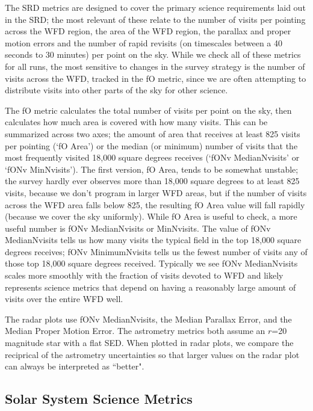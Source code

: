 The SRD metrics are designed to cover the primary science requirements laid out in the SRD; the most relevant of these relate to the number of visits per pointing across the WFD region, the area of the WFD region, the parallax and proper motion errors and the number of rapid revisits (on timescales between a 40 seconds to 30 minutes) per point on the sky. While we check all of these metrics for all runs, the most sensitive to changes in the survey strategy is the number of visits across the WFD, tracked in the fO metric, since we are often attempting to distribute visits into other parts of the sky for other science. 

The fO metric calculates the total number of visits per point on the sky, then calculates how much area is covered with how many visits. This can be summarized across two axes; the amount of area that receives at least 825 visits per pointing (`fO Area') or the median (or minimum) number of visits that the most frequently visited 18,000 square degrees receives (`fONv MedianNvisits' or `fONv MinNvisits'). The first version, fO Area, tends to be somewhat unstable; the survey hardly ever observes more than 18,000 square degrees to at least 825 visits, because we don't program in larger WFD areas, but if the number of visits across the WFD area falls below 825, the resulting fO Area value will fall rapidly (because we cover the sky uniformly). While fO Area is useful to check, a more useful number is fONv MedianNvisits or MinNvisits. The value of fONv MedianNvisits tells us how many visits the typical field in the top 18,000 square degrees receives; fONv MinimumNvisits tells us the fewest number of visits any of those top 18,000 square degrees received. Typically we see fONv MedianNvisits scales more smoothly with the fraction of visits devoted to WFD and likely represents science metrics that depend on having a reasonably large amount of visits over the entire WFD well. 

The radar plots use fONv MedianNvisits, the Median Parallax Error, and the Median Proper Motion Error. The astrometry metrics both assume an $r$=20 magnitude star with a flat SED. When plotted in radar plots, we compare the reciprical of the astrometry uncertainties so that larger values on the radar plot can always be interpreted as ``better".

\subsection{Solar System Science Metrics}

